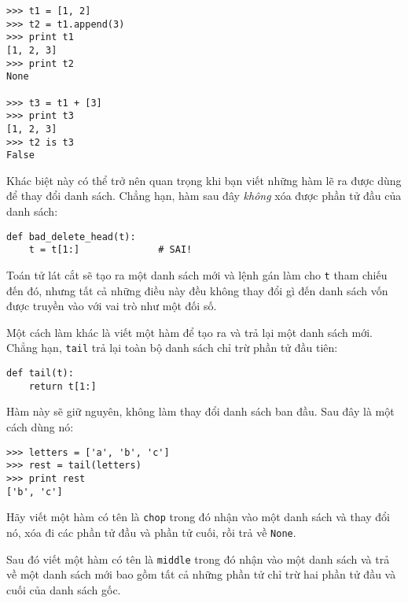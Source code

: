 \documentclass[11pt]{book}
\begin{document}

\beforeverb
\begin{verbatim}
>>> t1 = [1, 2]
>>> t2 = t1.append(3)
>>> print t1
[1, 2, 3]
>>> print t2
None

>>> t3 = t1 + [3]
>>> print t3
[1, 2, 3]
>>> t2 is t3
False
\end{verbatim}
\afterverb

Khác biệt này có thể trở nên quan trọng khi bạn viết những
hàm lẽ ra được dùng để thay đổi danh sách. Chẳng hạn, hàm
sau đây {\em không} xóa được phần tử đầu của danh sách:

\beforeverb
\begin{verbatim}
def bad_delete_head(t):
    t = t[1:]              # SAI!
\end{verbatim}
\afterverb

Toán tử lát cắt sẽ tạo ra một danh sách mới và lệnh gán làm
cho {\tt t} tham chiếu đến đó, nhưng tất cả những điều này đều 
không thay đổi gì đến danh sách vốn được truyền vào với vai trò như một
đối số.


Một cách làm khác là viết một hàm để tạo ra và trả lại một danh sách mới.
Chẳng hạn, {\tt tail} trả lại toàn bộ danh sách chỉ trừ phần tử đầu tiên:

\beforeverb
\begin{verbatim}
def tail(t):
    return t[1:]
\end{verbatim}
\afterverb
%
Hàm này sẽ giữ nguyên, không làm thay đổi danh sách ban đầu.
Sau đây là một cách dùng nó:

\beforeverb
\begin{verbatim}
>>> letters = ['a', 'b', 'c']
>>> rest = tail(letters)
>>> print rest
['b', 'c']
\end{verbatim}
\afterverb


\begin{ex}

Hãy viết một hàm có tên là {\tt chop} trong đó nhận vào một danh sách
và thay đổi nó, xóa đi các phần tử đầu và phần tử cuối, rồi trả về {\tt None}.

Sau đó viết một hàm có tên là {\tt middle} trong đó nhận vào một danh
sách và trả về một danh sách mới bao gồm tất cả những phần tử chỉ trừ
hai phần tử đầu và cuối của danh sách gốc.

\end{ex}
\end{document}
